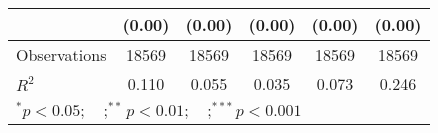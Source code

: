 \begin{table}[htbp]
\begin{tabular}{l*{5}{c}}
                    &      (0.00)         &      (0.00)         &      (0.00)         &      (0.00)         &      (0.00)         \\
\midrule
Observations        &       18569         &       18569         &       18569         &       18569         &       18569         \\
\(R^{2}\)           &       0.110         &       0.055         &       0.035         &       0.073         &       0.246         \\
\bottomrule
\multicolumn{6}{l}{\footnotesize $^{*}p<0.05; \quad ; ^{**} p<0.01; \quad ; ^{***}p<0.001$}\\
\end{tabular}
\end{table}
